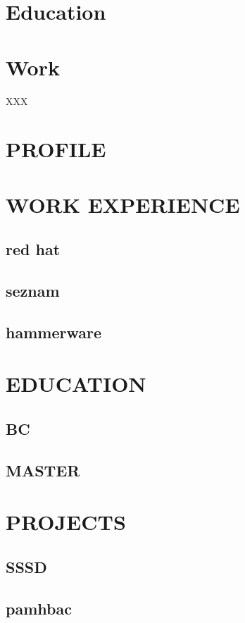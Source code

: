 \documentclass{mycv}
\begin{document}
\begin{paracol}{2}
\section{Education}

\section{Work}{XXX}

\section{PROFILE}

\lipsum[2]

\section{WORK EXPERIENCE}
\subsection{red hat}
\subsection{seznam}
\subsection{hammerware}

\section{EDUCATION}
\subsection{BC}
\subsection{MASTER}

\end{paracol}

\newpage

\section{PROJECTS}

\subsection{SSSD}

\subsection{pamhbac}

\faGithub
\faTwitter
\faMale
\end{document}
